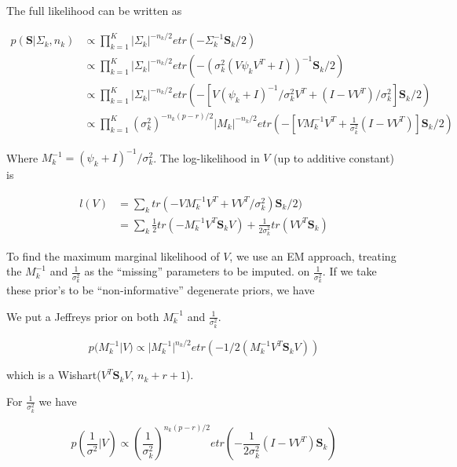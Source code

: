\documentclass{article}
\newcommand{\bl}[1]{{\mathbf #1}}
\begin{document}
The full likelihood can be written as

\begin{align}
p(\bl S | \Sigma_k,n_k) &\propto \prod_{k=1}^K |\Sigma_k|^{-n_k/2}etr(-\Sigma_k^{-1}\mathbf{S}_k/2)  \\
&\propto \prod_{k=1}^K  |\Sigma_k|^{-n_k/2}etr(-(\sigma_k^2(V\psi_kV^T +
  I))^{-1}\mathbf{S}_k/2) \\
&\propto \prod_{k=1}^K  |\Sigma_k|^{-n_k/2}etr(-\left[V(\psi_k +
  I)^{-1}/\sigma_k^2 V^T + (I-VV^T)/\sigma^2_k\right]\mathbf{S}_k/2)
  \\
&\propto \prod_{k=1}^K  (\sigma_k^2)^{-n_k(p-r)/2}|M_k|^{-n_k/2}etr(-\left[VM_k^{-1}V^T + \frac{1}{\sigma^2_k} (I-VV^T)\right]\mathbf{S}_k/2) 
\end{align}

Where $M_k^{-1} = (\psi_k + I) ^{-1}/\sigma_k^2$.  The log-likelihood in
$V$ (up to additive constant) is

\begin{align}
l(V) &= \sum_k tr\left(-VM_k^{-1}V^T +
       VV^T/\sigma^2_k\right)\mathbf{S}_k/2)\\
&= \sum_k \frac{1}{2}tr\left(-M_k^{-1}V^T \mathbf{S}_kV\right) + \frac{1}{2\sigma_k^2}tr\left(VV^T \mathbf{S}_k\right)
\end{align}


To find the maximum marginal likelihood of $V$, we use an EM approach,
treating the $M_k^{-1}$ and $\frac{1}{\sigma_k^2}$ as the ``missing''
parameters to be imputed. %
on $\frac{1}{\sigma_k^2}$.  If we take these prior's to be
``non-informative'' degenerate priors, we have

We put a Jeffreys prior on both $M_k^{-1}$ and $\frac{1}{\sigma_k^2}$.  

$$p(M_k^{-1} | V) \propto |M_k^{-1}|^{n_k/2}etr(-1/2(M_k^{-1}V^T\mathbf{S}_kV)) $$

\noindent which is a Wishart($V^T\mathbf{S}_kV$, $n_k + r + 1$).

\noindent For $\frac{1}{\sigma_k^2}$ we have

$$p\left(\frac{1}{\sigma^2} | V\right) \propto \left(\frac{1}{\sigma_k^2}\right)^{n_k(p-r)/2}etr\left(-\frac{1}{2\sigma^2_k} (I-VV^T)\mathbf{S}_k\right)  $$
\end{document}
